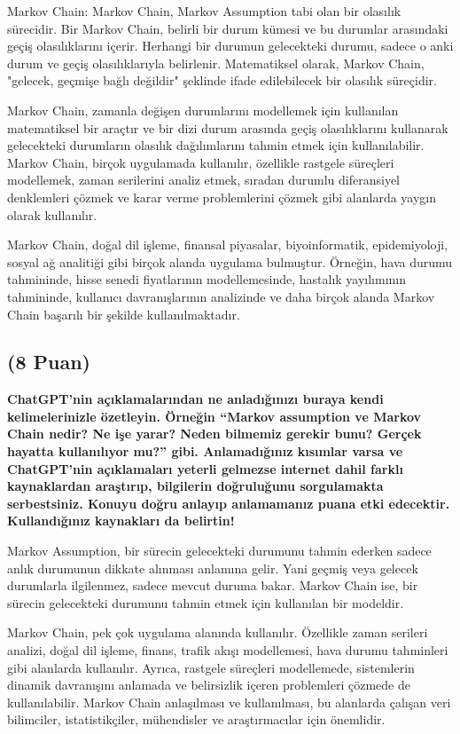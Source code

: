 \documentclass[11pt]{article}
\begin{document}
Markov Chain: Markov Chain, Markov Assumption tabi olan bir olasılık sürecidir. Bir Markov Chain, belirli bir durum kümesi ve bu durumlar arasındaki geçiş olasılıklarını içerir. Herhangi bir durumun gelecekteki durumu, sadece o anki durum ve geçiş olasılıklarıyla belirlenir. Matematiksel olarak, Markov Chain, "gelecek, geçmişe bağlı değildir" şeklinde ifade edilebilecek bir olasılık süreçidir.

Markov Chain, zamanla değişen durumlarını modellemek için kullanılan matematiksel bir araçtır ve bir dizi durum arasında geçiş olasılıklarını kullanarak gelecekteki durumların olasılık dağılımlarını tahmin etmek için kullanılabilir. Markov Chain, birçok uygulamada kullanılır, özellikle rastgele süreçleri modellemek, zaman serilerini analiz etmek, sıradan durumlu diferansiyel denklemleri çözmek ve karar verme problemlerini çözmek gibi alanlarda yaygın olarak kullanılır.

Markov Chain, doğal dil işleme, finansal piyasalar, biyoinformatik, epidemiyoloji, sosyal ağ analitiği gibi birçok alanda uygulama bulmuştur. Örneğin, hava durumu tahmininde, hisse senedi fiyatlarının modellemesinde, hastalık yayılımının tahmininde, kullanıcı davranışlarının analizinde ve daha birçok alanda Markov Chain başarılı bir şekilde kullanılmaktadır.


\subsection{(8 Puan)} \textbf{ChatGPT’nin açıklamalarından ne anladığınızı buraya kendi kelimelerinizle özetleyin. Örneğin ``Markov assumption ve Markov Chain nedir? Ne işe yarar? Neden bilmemiz gerekir bunu? Gerçek hayatta kullanılıyor mu?'' gibi. Anlamadığınız kısımlar varsa ve ChatGPT’nin açıklamaları yeterli gelmezse internet dahil farklı kaynaklardan araştırıp, bilgilerin doğruluğunu sorgulamakta serbestsiniz. Konuyu doğru anlayıp anlamamanız puana etki edecektir. Kullandığınız kaynakları da belirtin!}

Markov Assumption, bir sürecin gelecekteki durumunu tahmin ederken sadece anlık durumunun dikkate alınması anlamına gelir. Yani geçmiş veya gelecek durumlarla ilgilenmez, sadece mevcut duruma bakar. Markov Chain ise, bir sürecin gelecekteki durumunu tahmin etmek için kullanılan bir modeldir.

Markov Chain, pek çok uygulama alanında kullanılır. Özellikle zaman serileri analizi, doğal dil işleme, finans, trafik akışı modellemesi, hava durumu tahminleri gibi alanlarda kullanılır. Ayrıca, rastgele süreçleri modellemede, sistemlerin dinamik davranışını anlamada ve belirsizlik içeren problemleri çözmede de kullanılabilir. Markov Chain anlaşılması ve kullanılması, bu alanlarda çalışan veri bilimciler, istatistikçiler, mühendisler ve araştırmacılar için önemlidir.
\end{document}
